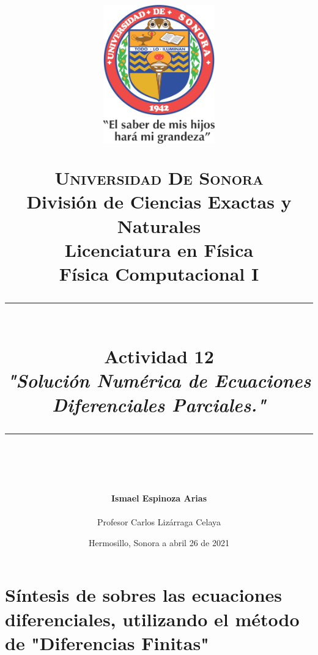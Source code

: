 \documentclass[12pt]{article}
\newcommand{\HRule}[1]{\rule{\linewidth}{#1}}
\begin{document}
\begin{titlepage}

\title{ \normalsize 
        \begin{center}
        \includegraphics[height=6cm]{Logo.jpg}
        \end{center}
        \LARGE \textsc{\textbf{Universidad De Sonora}} \\ \bigskip
		\Large División de Ciencias Exactas y Naturales \\
        Licenciatura en Física \\ \bigskip
        \bigskip
        Física Computacional I
		\\ [0.1cm]  
		\HRule{2pt} \\
		\Large \textbf{{Actividad 12}} \\
        \textit{\textbf{"Solución Numérica de Ecuaciones Diferenciales Parciales."}}
		\HRule{2pt} \\
		\normalsize \vspace*{0.001\baselineskip}}
        
\date{\bigskip \Large  \hspace*{\fill} Hermosillo, Sonora a abril 26 de 2021}

        
\author{
		\Large\textbf{Ismael Espinoza Arias} \\ \bigskip
        \\ \bigskip
       \Large Profesor Carlos Lizárraga Celaya}
       \end{titlepage}
       \maketitle
       
       


\section*{Síntesis de sobres las ecuaciones diferenciales, utilizando el método de "Diferencias Finitas"}
\end{document}

